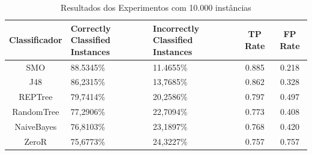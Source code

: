 \documentclass[
	12pt,				%
	openright,			%
	oneside,	
	a4paper,				%
	english,				%
	brazil				%
]{abntex2/abntex2} %
\begin{document}
		
				\begin{table}[htbp]
					\centering
					\caption{Resultados dos Experimentos com 10.000 instâncias}
					\label{tabResultadosExperimentos10k}
					\begin{center}
						\renewcommand{\arraystretch}{2}
						\begin{tabular}{cp{3cm}p{3.2cm}cc}
							\hline
							\textbf{Classificador}                & \textbf{Correctly Classified Instances}               & \textbf{Incorrectly Classified Instances}      	& \textbf{TP Rate}						&\textbf{FP Rate}   \\ \hline
							SMO                                      & 88.5345\%                                                                                 & 11.4655\% 							&0.885									&0.218                                                                                    \\
							J48                                      & 86,2315\%                                                                                  & 13,7685\% 							&0.862										&0.328                                                                                     \\
							REPTree                                  & 79,7414\%                                                                                 & 20,2586\%								&0.797											&0.497                                                                                     \\
							RandomTree                               & 77,2906\%                                                                                 & 22,7094\%								&0.773												&0.408                                                                                     \\
							NaiveBayes    									& 76,8103\%                                                 									& 23,1897\%								&0.768											&0.420                                                     								\\ \hline \hline
							ZeroR                               & 75,6773\%                                                                                 &  24,3227\%									&0.757												&0.757                                                                                     \\ \hline
						\end{tabular}
					\end{center}
				\end{table}
		
\end{document}
